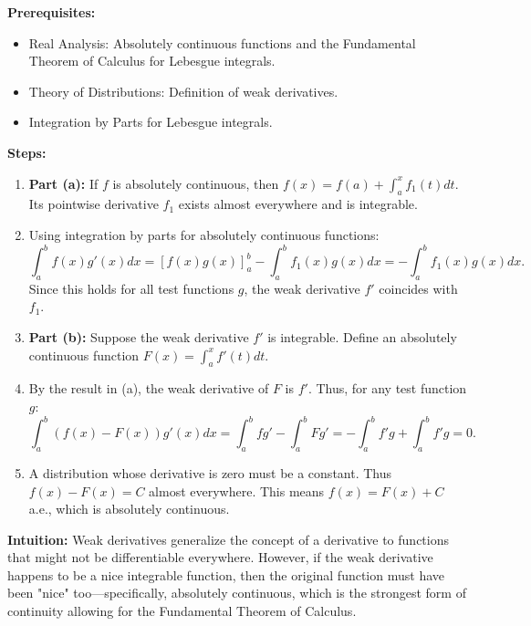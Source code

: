 \begin{solution}
\textbf{Prerequisites:}
\begin{itemize}
    \item Real Analysis: Absolutely continuous functions and the Fundamental Theorem of Calculus for Lebesgue integrals.
    \item Theory of Distributions: Definition of weak derivatives.
    \item Integration by Parts for Lebesgue integrals.
\end{itemize}

\textbf{Steps:}
\begin{enumerate}
    \item \textbf{Part (a):} If $f$ is absolutely continuous, then $f(x) = f(a) + \int_a^x f_1(t) dt$. Its pointwise derivative $f_1$ exists almost everywhere and is integrable.

    \item Using integration by parts for absolutely continuous functions:
    \[
    \int_a^b f(x) g'(x) dx = [f(x)g(x)]_a^b - \int_a^b f_1(x) g(x) dx = -\int_a^b f_1(x) g(x) dx.
    \]
    Since this holds for all test functions $g$, the weak derivative $f'$ coincides with $f_1$.

    \item \textbf{Part (b):} Suppose the weak derivative $f'$ is integrable. Define an absolutely continuous function $F(x) = \int_a^x f'(t) dt$.

    \item By the result in (a), the weak derivative of $F$ is $f'$. Thus, for any test function $g$:
    \[
    \int_a^b (f(x) - F(x)) g'(x) dx = \int_a^b f g' - \int_a^b F g' = -\int_a^b f' g + \int_a^b f' g = 0.
    \]

    \item A distribution whose derivative is zero must be a constant. Thus $f(x) - F(x) = C$ almost everywhere. This means $f(x) = F(x) + C$ a.e., which is absolutely continuous.
\end{enumerate}

\textbf{Intuition:}
Weak derivatives generalize the concept of a derivative to functions that might not be differentiable everywhere. However, if the weak derivative happens to be a nice integrable function, then the original function must have been "nice" too—specifically, absolutely continuous, which is the strongest form of continuity allowing for the Fundamental Theorem of Calculus.
\end{solution}

